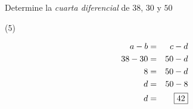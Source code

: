 \item{Determine la \textit{cuarta diferencial} de $38$, $30$ y $50$
	\begin{tasks}(5)
	\end{tasks}
	\begin{eqnarray*}
		a - b &=& c - d \\
		38 - 30 &=& 50 - d \\
		8 &=& 50 - d \\
		d &=& 50 - 8 \\
		d &=& \fbox{42}
	\end{eqnarray*}
}
